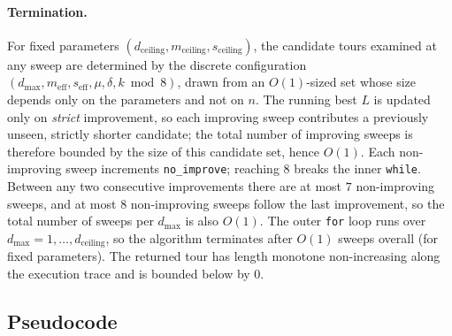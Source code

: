 \documentclass[11pt,a4paper]{article}
\begin{document}
\paragraph{Termination.} For fixed parameters
$(d_{\text{ceiling}}, m_{\text{ceiling}}, s_{\text{ceiling}})$, the
candidate tours examined at any sweep are determined by the discrete
configuration $(d_{\max}, m_{\text{eff}}, s_{\text{eff}}, \mu, \delta,
k \bmod 8)$, drawn from an $O(1)$-sized set whose size depends only
on the parameters and not on $n$. The running best $L$ is updated
only on \emph{strict} improvement, so each improving sweep contributes
a previously unseen, strictly shorter candidate; the total number of
improving sweeps is therefore bounded by the size of this candidate
set, hence $O(1)$. Each non-improving sweep increments
\texttt{no\_improve}; reaching $8$ breaks the inner \texttt{while}.
Between any two consecutive improvements there are at most $7$
non-improving sweeps, and at most $8$ non-improving sweeps follow the
last improvement, so the total number of sweeps per $d_{\max}$ is
also $O(1)$. The outer \texttt{for} loop runs over $d_{\max} = 1,
\dots, d_{\text{ceiling}}$, so the algorithm terminates after $O(1)$
sweeps overall (for fixed parameters). The returned tour has length
monotone non-increasing along the execution trace and is bounded
below by $0$.

\subsection{Pseudocode}
\end{document}
